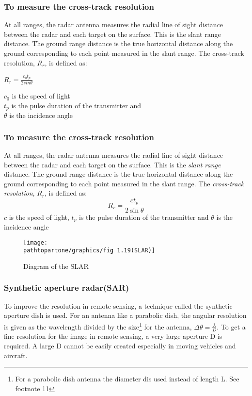 \subsubsection{To measure the cross-track resolution}
At all ranges, the radar antenna measures the radial line of sight distance between the radar and each target on the surface. This is the slant range distance. The ground range distance is the true horizontal distance along the ground corresponding to each point measured in the slant range. The cross-track resolution, $R_{r}$, is defined as:  
\begin{center}
$R_{r}=\frac{c_{0} t_{p}}{2 sin\theta}$
\end{center}
$c_{0}$ is the speed of light\\
$t_{p}$ is the pulse duration of the transmitter and\\
$\theta$ is the incidence angle

\subsubsection{To measure the cross-track resolution}
At all ranges, the radar antenna measures the radial line of sight distance between the radar and each target on the surface. This is the \textit{slant range} distance. The ground range distance is the true horizontal distance along the ground corresponding to each point measured in the slant range. The \textit{cross-track resolution}, $R_{r}$, is defined as:  
\begin{dmath*}
R_{r}=\frac{ct_{p}}{2\sin\theta}
\end{dmath*}
$c$ is the speed of light, $t_{p}$ is the pulse duration of the transmitter and $\theta$ is the incidence angle
\begin{figure}[h]
\centering
\texttt{[image: \\pathtopartone/graphics/fig 1.19(SLAR)]}
\caption{Diagram of the SLAR}
\end{figure}

\subsubsection{Synthetic aperture radar(SAR)}
To improve the resolution in remote sensing, a technique called the synthetic aperture dish is used. For an antenna like a parabolic dish, the angular resolution is given as the wavelength divided by the size\footnote{For a parabolic dish antenna the diameter \textquotesingle d\textquotesingle is used instead of length \textquotesingle L\textquotesingle. See footnote 11} for the antenna, $\Delta \theta = \frac{\lambda}{D}$. To get a fine resolution for the image in remote sensing, a very large aperture D is required. A large D cannot be easily created especially in moving vehicles and aircraft.\\

